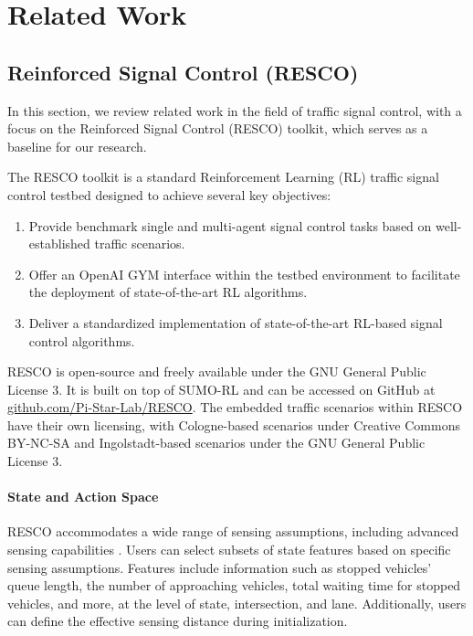 \chapter{Related Work}
\section{Reinforced Signal Control (RESCO)}
In this section, we review related work in the field of traffic signal control, with a focus on the Reinforced Signal Control (RESCO) toolkit, which serves as a baseline for our research.

The RESCO toolkit is a standard Reinforcement Learning (RL) traffic signal control testbed designed to achieve several key objectives:

\begin{enumerate}
    \item Provide benchmark single and multi-agent signal control tasks based on well-established traffic scenarios.
    \item Offer an OpenAI GYM interface within the testbed environment to facilitate the deployment of state-of-the-art RL algorithms.
    \item Deliver a standardized implementation of state-of-the-art RL-based signal control algorithms.
\end{enumerate}

RESCO is open-source and freely available under the GNU General Public License 3. It is built on top of SUMO-RL \cite{alegre2019sumo-rl} and can be accessed on GitHub at \url{github.com/Pi-Star-Lab/RESCO}. The embedded traffic scenarios within RESCO have their own licensing, with Cologne-based scenarios under Creative Commons BY-NC-SA and Ingolstadt-based scenarios under the GNU General Public License 3.

\subsubsection{State and Action Space}

RESCO accommodates a wide range of sensing assumptions, including advanced sensing capabilities \cite{codeca2018monaco}. Users can select subsets of state features based on specific sensing assumptions. Features include information such as stopped vehicles' queue length, the number of approaching vehicles, total waiting time for stopped vehicles, and more, at the level of state, intersection, and lane. Additionally, users can define the effective sensing distance during initialization.

